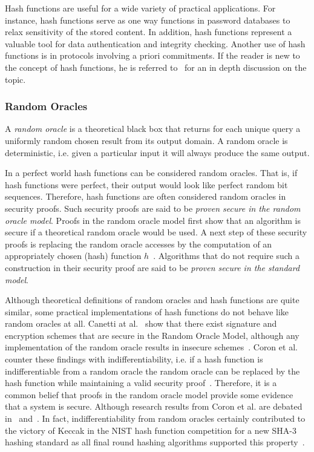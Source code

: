 Hash functions are useful for a wide variety of practical applications. For instance, hash functions serve as one way functions in password databases to relax sensitivity of the stored content. In addition, hash functions represent a valuable tool for data authentication and integrity checking. Another use of hash functions is in protocols involving a priori commitments. If the reader is new to the concept of hash functions, he is referred to~\cite{book:handbook_of_applied_cryptography} for an in depth discussion on the topic.

\subsubsection{Random Oracles}
A \textit{random oracle} is a theoretical black box that returns for each unique query a uniformly random chosen result from its output domain. A random oracle is deterministic, i.e. given a particular input it will always produce the same output.

In a perfect world hash functions can be considered random oracles. That is, if hash functions were perfect, their output would look like perfect random bit sequences. Therefore, hash functions are often considered random oracles in security proofs. Such security proofs are said to be \textit{proven secure in the random oracle model}. Proofs in the random oracle model first show that an algorithm is secure if a theoretical random oracle would be used. A next step of these security proofs is replacing the random oracle accesses by the computation of an appropriately chosen (hash) function $h$~\cite{art:BellareR93}. Algorithms that do not require such a construction in their security proof are said to be \textit{proven secure in the standard model}.

Although theoretical definitions of random oracles and hash functions are quite similar, some practical implementations of hash functions do not behave like random oracles at all. Canetti at al.~\cite{art:CanettiGH04} show that there exist signature and encryption schemes that are secure in the Random Oracle Model, although any implementation of the random oracle results in insecure schemes~\cite{art:CanettiGH04}. Coron et al. counter these findings with indifferentiability, i.e. if a hash function is indifferentiable from a random oracle the random oracle can be replaced by the hash function while maintaining a valid security proof~\cite{art:CoronDMP05}. Therefore, it is a common belief that proofs in the random oracle model provide some evidence that a system is secure. Although research results from Coron et al. are debated in~\cite{art:FleischmannGL10} and~\cite{art:RistenpartSS11}. In fact, indifferentiability from random oracles certainly contributed to the victory of Keccak in the NIST hash function competition for a new SHA-3 hashing standard as all final round hashing algorithms supported this property~\cite{art:BartheGHOB13}.

